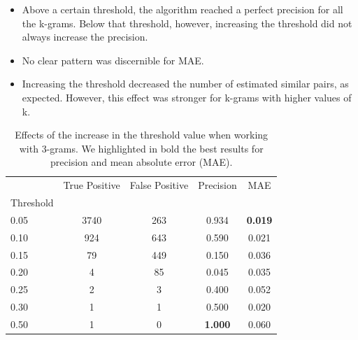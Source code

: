 \documentclass[runningheads]{llncs}
\begin{document}
\begin{itemize}
  \item Above a certain threshold, the algorithm reached a perfect precision for all the k-grams. Below that threshold, however, increasing the threshold did not always increase the precision.
  \item No clear pattern was discernible for MAE.
  \item Increasing the threshold decreased the number of estimated similar pairs, as expected. However, this effect was stronger for k-grams with higher values of k. 
\end{itemize}

\begin{table}
  \caption{Effects of the increase in the threshold value when working with 3-grams. We highlighted in bold the best results for precision and mean absolute error (MAE).}
  \label{tab:experiments:threshold_k3}
  \centering
  \begin{tabular}{lcccc}
    \toprule
    {} &  True Positive &  False Positive &  Precision &    MAE \\
    Threshold &                &                 &            &        \\
    \midrule
    0.05      &           3740 &             263 &      0.934 &  \textbf{0.019} \\
    0.10      &            924 &             643 &      0.590 &  0.021 \\
    0.15      &             79 &             449 &      0.150 &  0.036 \\
    0.20      &              4 &              85 &      0.045 &  0.035 \\
    0.25      &              2 &               3 &      0.400 &  0.052 \\
    0.30      &              1 &               1 &      0.500 &  0.020 \\
    0.50      &              1 &               0 &      \textbf{1.000} &  0.060 \\
    \bottomrule
    \end{tabular}
\end{table}
\end{document}
